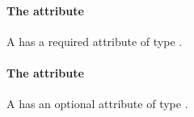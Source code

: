 \paragraph{The \fixttspace{} attribute}

A \SpatialPoints has a required attribute  of
type .


\paragraph{The \fixttspace{} attribute}

A \SpatialPoints has an optional attribute  of type
.


